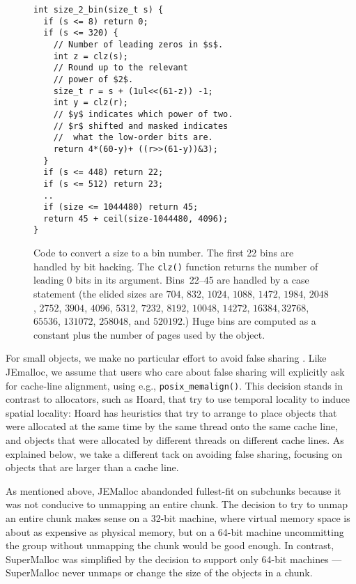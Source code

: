 \documentclass{sigplanconf}
\newcommand{\code}[1]{\texttt{#1}}
\newcommand{\bcknote}[1]{\cnote{red}{#1}{bck}}
\begin{document}
\begin{figure}
\begin{verbatim}
int size_2_bin(size_t s) {
  if (s <= 8) return 0;
  if (s <= 320) {
    // Number of leading zeros in $s$.
    int z = clz(s);
    // Round up to the relevant
    // power of $2$.
    size_t r = s + (1ul<<(61-z)) -1;
    int y = clz(r);
    // $y$ indicates which power of two.
    // $r$ shifted and masked indicates
    //  what the low-order bits are.
    return 4*(60-y)+ ((r>>(61-y))&3);
  }
  if (s <= 448) return 22;
  if (s <= 512) return 23;
  ..
  if (size <= 1044480) return 45;
  return 45 + ceil(size-1044480, 4096);
}
\end{verbatim}
\caption{Code to convert a size to a bin number.  The first 22 bins
  are handled by bit hacking. The \code{clz()} function returns the
  number of leading 0 bits in its argument. Bins~22--45 are handled by
  a case statement (the elided sizes are $704$, $832$, $1024$, $1088$,
  $1472$, $1984$, $2048$, $2752$, $3904$, $4096$, $5312$, $7232$,
  $8192$, $10048$, $14272$, $16384, 32768$, $65536$, $131072$,
  $258048$, and $520192$.)  Huge bins are computed as a constant plus
  the number of pages used by the object.}
\label{fig:size2bin}
\end{figure}

For small objects, we make no particular effort to avoid false sharing
\cite{BoloskySc93}.  Like JEmalloc, we assume that users who care
about false sharing will explicitly ask for cache-line alignment,
using e.g., \code{posix_memalign()}.  This decision stands in contrast
to allocators, such as Hoard, that try to use temporal locality to
induce spatial locality: Hoard has heuristics that try to arrange to
place objects that were allocated at the same time by the same thread
onto the same cache line, and objects that were allocated by different
threads on different cache lines.  As explained below, we take a
different tack on avoiding false sharing, focusing on objects that are
larger than a cache line.

\bcknote{supermalloc does fullest fit.}

As mentioned above, JEMalloc abandonded fullest-fit on subchunks
because it was not conducive to unmapping an entire chunk.  The
decision to try to unmap an entire chunk makes sense on a 32-bit
machine, where virtual memory space is about as expensive as physical
memory, but on a 64-bit machine uncommitting the group without
unmapping the chunk would be good enough.  In contrast, SuperMalloc
was simplified by the decision to support only 64-bit machines ---
SuperMalloc never unmaps or change the size of the objects in a chunk.
\end{document}
